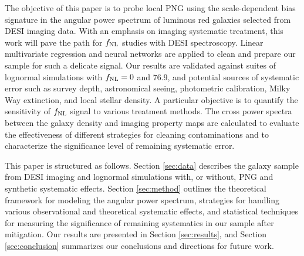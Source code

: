 The objective of this paper is to probe local PNG using the scale-dependent bias signature in the angular power spectrum of luminous red galaxies selected from DESI imaging data. With an emphasis on imaging systematic treatment, this work will pave the path for $f_{\rm NL}$ studies with DESI spectroscopy. Linear multivariate regression and neural networks are applied to clean and prepare our sample for such a delicate signal. Our results are validated against suites of lognormal simulations with $f_{\rm NL}=0$ and $76.9$, and potential sources of systematic error such as survey depth, astronomical seeing, photometric calibration, Milky Way extinction, and local stellar density. A particular objective is to quantify the sensitivity of $f_{\rm NL}$ signal to various treatment methods. The cross power spectra between the galaxy density and imaging property maps are calculated to evaluate the effectiveness of different strategies for cleaning contaminations and to characterize the significance level of remaining systematic error. 

This paper is structured as follows. Section \ref{sec:data} describes the galaxy sample from DESI imaging and lognormal simulations with, or without, PNG and synthetic systematic effects. Section \ref{sec:method} outlines the theoretical framework for modeling the angular power spectrum, strategies for handling various observational and theoretical systematic effects, and statistical techniques for measuring the significance of remaining systematics in our sample after mitigation. Our results are presented in Section \ref{sec:results}, and Section \ref{sec:conclusion} summarizes our conclusions and directions for future work.